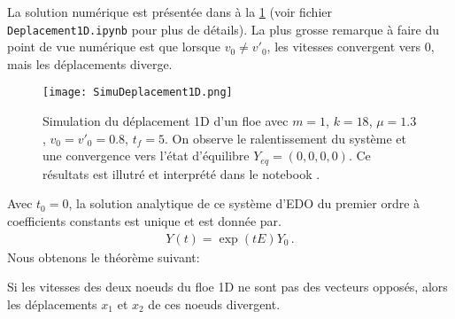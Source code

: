 La solution numérique est présentée dans à la \cref{fig:simudept1d} (voir fichier \verb|Deplacement1D.ipynb| pour plus de détails). La plus grosse remarque à faire du point de vue numérique est que lorsque $v_0 \neq v'_0$, les vitesses convergent vers $0$, mais les déplacements diverge.
\begin{figure}[!h]
    \centering
    \texttt{[image: SimuDeplacement1D.png]}
    \caption{Simulation du déplacement 1D d'un floe avec $m=1$, $k=18$, $\mu=1.3$, $v_0=v'_0 = 0.8$, $t_{f}=5$. On observe le ralentissement du système et une convergence vers l'état d'équilibre $Y_{eq}= (0,0,0,0)$. Ce résultats est illutré et interprété dans le notebook .}
    \label{fig:simudept1d}
\end{figure}

Avec $t_0= 0$, la solution analytique de ce système d'EDO du premier ordre à coefficients constants est unique et est donnée par.
\begin{align}
    Y(t) = \exp(tE)Y_0 \,.
\end{align}
Nous obtenons le théorème suivant:
\begin{theorem}
    Si les vitesses des deux noeuds du floe 1D ne sont pas des vecteurs opposés, alors les déplacements $x_1$ et $x_2$ de ces noeuds divergent.
\end{theorem}

